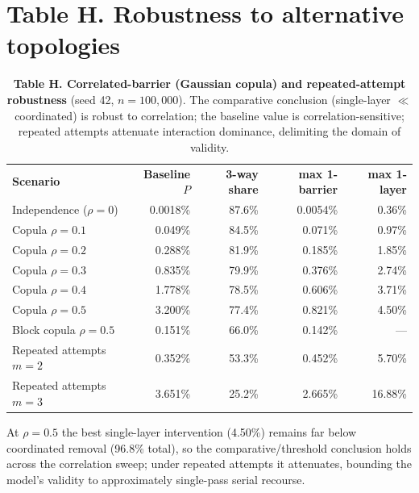 \documentclass[10pt,letterpaper]{article}
\newlength\savedwidth
\newcommand\thickhline{\noalign{\global\savedwidth\arrayrulewidth\global\arrayrulewidth 2pt}\hline\noalign{\global\arrayrulewidth\savedwidth}}
\begin{document}
\section*{Table H. Robustness to alternative topologies}
\begin{table}[!ht]\centering
\caption{{\bf Table H. Correlated-barrier (Gaussian copula) and repeated-attempt robustness} (seed 42, $n=100{,}000$). The comparative conclusion (single-layer $\ll$ coordinated) is robust to correlation; the baseline value is correlation-sensitive; repeated attempts attenuate interaction dominance, delimiting the domain of validity.}
\label{SCopula}
\begin{tabular}{l r r r r}
\hline \textbf{Scenario} & \textbf{Baseline $P$} & \textbf{3-way share} & \textbf{max 1-barrier} & \textbf{max 1-layer} \\ \thickhline
Independence ($\rho=0$) & 0.0018\% & 87.6\% & 0.0054\% & 0.36\% \\
Copula $\rho=0.1$ & 0.049\% & 84.5\% & 0.071\% & 0.97\% \\
Copula $\rho=0.2$ & 0.288\% & 81.9\% & 0.185\% & 1.85\% \\
Copula $\rho=0.3$ & 0.835\% & 79.9\% & 0.376\% & 2.74\% \\
Copula $\rho=0.4$ & 1.778\% & 78.5\% & 0.606\% & 3.71\% \\
Copula $\rho=0.5$ & 3.200\% & 77.4\% & 0.821\% & 4.50\% \\ \hline
Block copula $\rho=0.5$ & 0.151\% & 66.0\% & 0.142\% & --- \\ \hline
Repeated attempts $m=2$ & 0.352\% & 53.3\% & 0.452\% & 5.70\% \\
Repeated attempts $m=3$ & 3.651\% & 25.2\% & 2.665\% & 16.88\% \\ \hline
\end{tabular}
\end{table}

At $\rho=0.5$ the best single-layer intervention (4.50\%) remains far below coordinated removal (96.8\% total), so the comparative/threshold conclusion holds across the correlation sweep; under repeated attempts it attenuates, bounding the model's validity to approximately single-pass serial recourse.

\end{document}
